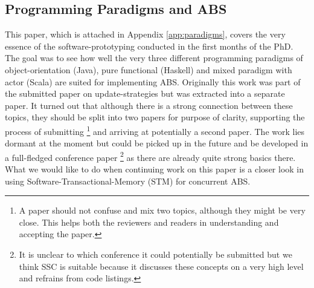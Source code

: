 \subsection{Programming Paradigms and ABS}
This paper, which is attached in Appendix \ref{app:paradigms}, covers the very essence of the software-prototyping conducted in the first months of the PhD. The goal was to see how well the very three different programming paradigms of object-orientation (Java), pure functional (Haskell) and mixed paradigm with actor (Scala) are suited for implementing ABS. Originally this work was part of the submitted paper on update-strategies but was extracted into a separate paper. It turned out that although there is a strong connection between these topics, they should be split into two papers for purpose of clarity, supporting the process of submitting \footnote{A paper should not confuse and mix two topics, although they might be very close. This helps both the reviewers and readers in understanding and accepting the paper.} and arriving at potentially a second paper.
The work lies dormant at the moment but could be picked up in the future and be developed in a full-fledged conference paper \footnote{It is unclear to which conference it could potentially be submitted but we think SSC is suitable because it discusses these concepts on a very high level and refrains from code listings.} as there are already quite strong basics there. What we would like to do when continuing work on this paper is a closer look in using Software-Transactional-Memory (STM) for concurrent ABS.

